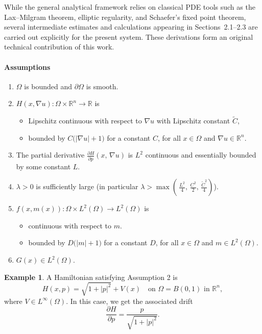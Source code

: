 \documentclass[11pt]{article}
\numberwithin{equation}{section}
\theoremstyle{definition}
\newtheorem{example}[example]{Example}
\theoremstyle{remark}
\newcommand{\R}{\mathbb{R}}
\newcommand{\Ltwo}{L^2(\Omega)}
\newcommand{\Hp}{\frac{\partial H}{\partial p}}
\begin{document}
While the general analytical framework relies on classical PDE tools such as the Lax--Milgram theorem, elliptic regularity, and Schaefer's fixed point theorem,
several intermediate estimates and calculations appearing in Sections~2.1--2.3 
are carried out explicitly for the present system. These derivations form an original technical contribution of this work.

\paragraph{Assumptions}
\begin{enumerate}[label=\arabic*., leftmargin=*, itemsep=0.35em]
  \item $\Omega$ is bounded and $\partial\Omega$ is smooth.
  \item $H(x,\nabla u):\Omega \times \R^n\to\R$ is
  \begin{itemize}[leftmargin=*, itemsep=0.25em]
    \item Lipschitz continuous with respect to $\nabla u$ with Lipschitz constant $\tilde{C}$,
    \item bounded by $C\bigl(|\nabla u|+1\bigr)$ for a constant $C$, for all $x\in \Omega$ and $\nabla u\in\R^n$.
  \end{itemize}
  \item The partial derivative $\Hp(x,\, \nabla u)$ is $L^2$ continuous and essentially bounded by some constant $L$.
  \item $\lambda >0$ is sufficiently large (in particular $\lambda>\max(\,\frac{L^2}{4},\,\frac{C^2}{2},\,\frac{\tilde{C}^2}{4})$).
  \item $f(x,m(x)):\Omega \times \Ltwo \to \Ltwo$ is
  \begin{itemize}[leftmargin=*, itemsep=0.25em]
    \item continuous with respect to $m$.
    \item bounded by $D\bigl(|m|+1\bigr)$ for a constant $D$, for all $x\in \Omega$ and $m\in \Ltwo$.
  \end{itemize}
  \item $G(x) \in \Ltwo$.
\end{enumerate}

\begin{example}
A Hamiltonian satisfying Assumption 2 is
\[
H(x,p) = \sqrt{1+|p|^2} + V(x) \quad \text{on } \Omega = B(0,1) \text{ in } \R^n,
\]
where $V \in L^\infty(\Omega)$. In this case, we get the associated drift 
\[\Hp = \frac{p}{\sqrt{1 + |p|^2}}.\]
\end{example}
\end{document}
